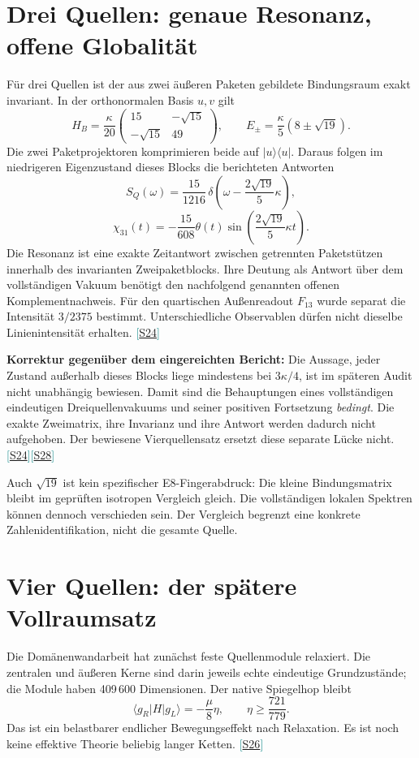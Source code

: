 \documentclass[11pt,a4paper,oneside,parskip=half,headings=normal,numbers=noenddot,bibliography=totoc]{scrreprt}
\newcommand{\ket}[1]{\lvert #1\rangle}
\newcommand{\bra}[1]{\langle #1\rvert}
\newcommand{\src}[1]{\textcolor{teal}{\small[\hyperref[s:#1]{S#1}]}}
\begin{document}
\section{Drei Quellen: genaue Resonanz, offene Globalität}
Für drei Quellen ist der aus zwei äußeren Paketen gebildete Bindungsraum exakt invariant. In der orthonormalen Basis $u,v$ gilt
\[
 H_B=\frac\kappa{20}\begin{pmatrix}15&-\sqrt{15}\\-\sqrt{15}&49\end{pmatrix},
 \qquad E_\pm=\frac\kappa5(8\pm\sqrt{19}).
\]
Die zwei Paketprojektoren komprimieren beide auf $\ket u\bra u$. Daraus folgen im niedrigeren Eigenzustand dieses Blocks die berichteten Antworten
\[
 S_Q(\omega)=\frac{15}{1216}\,
 \delta\!\left(\omega-\frac{2\sqrt{19}}5\kappa\right),
\]
\[
 \chi_{31}(t)=-\frac{15}{608}\theta(t)
 \sin\!\left(\frac{2\sqrt{19}}5\kappa t\right).
\]
Die Resonanz ist eine exakte Zeitantwort zwischen getrennten Paketstützen innerhalb des invarianten Zweipaketblocks. Ihre Deutung als Antwort über dem vollständigen Vakuum benötigt den nachfolgend genannten offenen Komplementnachweis. Für den quartischen Außenreadout $F_{13}$ wurde separat die Intensität $3/2375$ bestimmt. Unterschiedliche Observablen dürfen nicht dieselbe Linienintensität erhalten. \src{24}

\textbf{Korrektur gegenüber dem eingereichten Bericht:} Die Aussage, jeder Zustand außerhalb dieses Blocks liege mindestens bei $3\kappa/4$, ist im späteren Audit nicht unabhängig bewiesen. Damit sind die Behauptungen eines vollständigen eindeutigen Dreiquellenvakuums und seiner positiven Fortsetzung \emph{bedingt}. Die exakte Zweimatrix, ihre Invarianz und ihre Antwort werden dadurch nicht aufgehoben. Der bewiesene Vierquellensatz ersetzt diese separate Lücke nicht. \src{24}\src{28}

Auch $\sqrt{19}$ ist kein spezifischer E8-Fingerabdruck: Die kleine Bindungsmatrix bleibt im geprüften isotropen Vergleich gleich. Die vollständigen lokalen Spektren können dennoch verschieden sein. Der Vergleich begrenzt eine konkrete Zahlenidentifikation, nicht die gesamte Quelle.

\section{Vier Quellen: der spätere Vollraumsatz}
Die Domänenwandarbeit hat zunächst feste Quellenmodule relaxiert. Die zentralen und äußeren Kerne sind darin jeweils echte eindeutige Grundzustände; die Module haben 409\,600 Dimensionen. Der native Spiegelhop bleibt
\[
 \langle g_R|H|g_L\rangle=-\frac\mu8\eta,\qquad
 \eta\ge\frac{721}{779}.
\]
Das ist ein belastbarer endlicher Bewegungseffekt nach Relaxation. Es ist noch keine effektive Theorie beliebig langer Ketten. \src{26}
\end{document}
